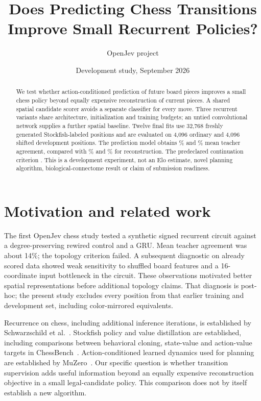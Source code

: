\documentclass[10pt]{article}
\title{Does Predicting Chess Transitions Improve Small Recurrent Policies?}
\author{OpenJev project}
\date{Development study, September 2026}
\begin{document}
\maketitle
\begin{abstract}
We test whether action-conditioned prediction of future board pieces improves a
small chess policy beyond equally expensive reconstruction of current pieces.
A shared spatial candidate scorer avoids a separate classifier for every move.
Three recurrent variants share architecture, initialization and training budgets;
an untied convolutional network supplies a further spatial baseline.
Twelve final fits use 32,768 freshly generated Stockfish-labeled positions and
are evaluated on 4,096 ordinary and 4,096 shifted development positions.
The prediction model obtains \PredictDev\% and \PredictShift\% mean teacher
agreement, compared with \ReconstructDev\% and \ReconstructShift\% for
reconstruction. The predeclared continuation criterion \GateOutcome.
\ResultInterpretation{}
This is a development experiment, not an Elo estimate, novel planning algorithm,
biological-connectome result or claim of submission readiness.
\end{abstract}

\section{Motivation and related work}
The first OpenJev chess study tested a synthetic signed recurrent circuit against
a degree-preserving rewired control and a GRU. Mean teacher agreement was about
14\%; the topology criterion failed. A subsequent diagnostic on already scored
data showed weak sensitivity to shuffled board features and a 16-coordinate
input bottleneck in the circuit. These observations motivated better spatial
representations before additional topology claims. That diagnosis is post-hoc;
the present study excludes every position from that earlier training and
development set, including color-mirrored equivalents.

Recurrence on chess, including additional inference iterations, is established
by Schwarzschild et al.~\cite{schwarzschild2021}. Stockfish policy and value
distillation are established, including comparisons between behavioral cloning,
state-value and action-value targets in ChessBench~\cite{ruoss2024}.
Action-conditioned learned dynamics used for planning are established by
MuZero~\cite{schrittwieser2020}. Our specific question is whether transition
supervision adds useful information beyond an equally expensive reconstruction
objective in a small legal-candidate policy. This comparison does not by itself
establish a new algorithm.
\end{document}
